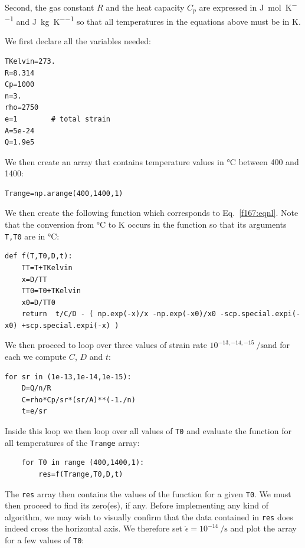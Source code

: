 Second, the gas constant $R$ and the heat capacity $C_p$ are expressed in 
\si{\joule\per\mol\per\kelvin} and \si{\joule\per\kg\per\kelvin} so that 
all temperatures in the equations above must be in \si{\kelvin}.

We first declare all the variables needed:

\begin{lstlisting}
TKelvin=273.
R=8.314
Cp=1000
n=3.
rho=2750
e=1        # total strain
A=5e-24
Q=1.9e5
\end{lstlisting}

We then create an array that contains
temperature values in \si{\celsius} between 400 and 1400:

\begin{lstlisting}
Trange=np.arange(400,1400,1)
\end{lstlisting}

We then create the following function which corresponds to Eq.~\eqref{f167:eqnl}.
Note that the conversion from \si{\celsius} to \si{\kelvin} occurs in the function
so that its arguments \lstinline|T,T0| are in \si{\celsius}:
\begin{lstlisting}
def f(T,T0,D,t):
    TT=T+TKelvin
    x=D/TT
    TT0=T0+TKelvin
    x0=D/TT0
    return  t/C/D - ( np.exp(-x)/x -np.exp(-x0)/x0 -scp.special.expi(-x0) +scp.special.expi(-x) ) 
\end{lstlisting}

We then proceed to loop over three values of strain rate $10^{-13,-14,-15}~\si{\per\second}$and 
for each we compute $C$, $D$ and $t$:

\begin{lstlisting}
for sr in (1e-13,1e-14,1e-15):
    D=Q/n/R
    C=rho*Cp/sr*(sr/A)**(-1./n)
    t=e/sr
\end{lstlisting}

Inside this loop we then loop over all values of \lstinline|T0| and 
evaluate the function for all temperatures of the \lstinline|Trange| array:
\begin{lstlisting}
    for T0 in range (400,1400,1):
        res=f(Trange,T0,D,t)
\end{lstlisting}

The \lstinline|res| array then contains the values of the function for a given \lstinline|T0|.
We must then proceed to find its zero(es), if any. 
Before implementing any kind of algorithm, we may wish to visually confirm 
that the data contained in \lstinline|res| does indeed cross the horizontal axis. 
We therefore set $\dot\epsilon=10^{-14}~\si{\per\second}$ and plot the array 
for a few values of \lstinline|T0|:

